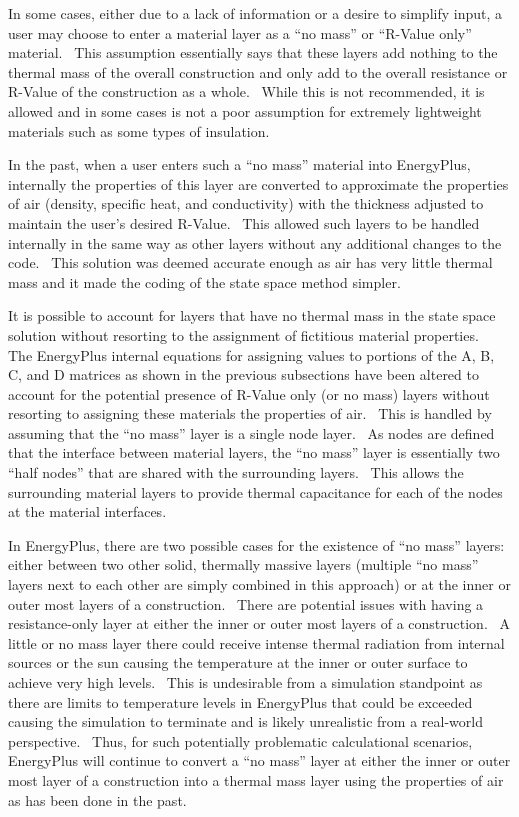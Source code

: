 In some cases, either due to a lack of information or a desire to simplify input, a user may choose to enter a material layer as a ``no mass'' or ``R-Value only'' material.~ This assumption essentially says that these layers add nothing to the thermal mass of the overall construction and only add to the overall resistance or R-Value of the construction as a whole.~ While this is not recommended, it is allowed and in some cases is not a poor assumption for extremely lightweight materials such as some types of insulation.

In the past, when a user enters such a ``no mass'' material into EnergyPlus, internally the properties of this layer are converted to approximate the properties of air (density, specific heat, and conductivity) with the thickness adjusted to maintain the user's desired R-Value.~ This allowed such layers to be handled internally in the same way as other layers without any additional changes to the code.~ This solution was deemed accurate enough as air has very little thermal mass and it made the coding of the state space method simpler.

It is possible to account for layers that have no thermal mass in the state space solution without resorting to the assignment of fictitious material properties.~ The EnergyPlus internal equations for assigning values to portions of the A, B, C, and D matrices as shown in the previous subsections have been altered to account for the potential presence of R-Value only (or no mass) layers without resorting to assigning these materials the properties of air.~ This is handled by assuming that the ``no mass'' layer is a single node layer.~ As nodes are defined that the interface between material layers, the ``no mass'' layer is essentially two ``half nodes'' that are shared with the surrounding layers.~ This allows the surrounding material layers to provide thermal capacitance for each of the nodes at the material interfaces.

In EnergyPlus, there are two possible cases for the existence of ``no mass'' layers: either between two other solid, thermally massive layers (multiple ``no mass'' layers next to each other are simply combined in this approach) or at the inner or outer most layers of a construction.~ There are potential issues with having a resistance-only layer at either the inner or outer most layers of a construction.~ A little or no mass layer there could receive intense thermal radiation from internal sources or the sun causing the temperature at the inner or outer surface to achieve very high levels.~ This is undesirable from a simulation standpoint as there are limits to temperature levels in EnergyPlus that could be exceeded causing the simulation to terminate and is likely unrealistic from a real-world perspective.~ Thus, for such potentially problematic calculational scenarios, EnergyPlus will continue to convert a ``no mass'' layer at either the inner or outer most layer of a construction into a thermal mass layer using the properties of air as has been done in the past.

